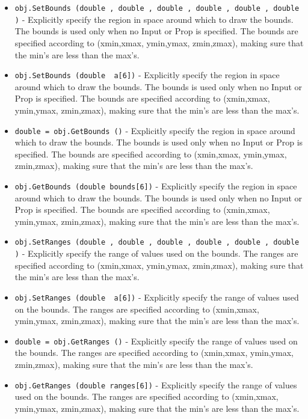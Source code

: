 \begin{itemize}
\item  \verb|obj.SetBounds (double , double , double , double , double , double )| -  Explicitly specify the region in space around which to draw the bounds.
 The bounds is used only when no Input or Prop is specified. The bounds
 are specified according to (xmin,xmax, ymin,ymax, zmin,zmax), making
 sure that the min's are less than the max's.

\item  \verb|obj.SetBounds (double  a[6])| -  Explicitly specify the region in space around which to draw the bounds.
 The bounds is used only when no Input or Prop is specified. The bounds
 are specified according to (xmin,xmax, ymin,ymax, zmin,zmax), making
 sure that the min's are less than the max's.

\item  \verb|double = obj.GetBounds ()| -  Explicitly specify the region in space around which to draw the bounds.
 The bounds is used only when no Input or Prop is specified. The bounds
 are specified according to (xmin,xmax, ymin,ymax, zmin,zmax), making
 sure that the min's are less than the max's.

\item  \verb|obj.GetBounds (double bounds[6])| -  Explicitly specify the region in space around which to draw the bounds.
 The bounds is used only when no Input or Prop is specified. The bounds
 are specified according to (xmin,xmax, ymin,ymax, zmin,zmax), making
 sure that the min's are less than the max's.

\item  \verb|obj.SetRanges (double , double , double , double , double , double )| -  Explicitly specify the range of values used on the bounds.
 The ranges are specified according to (xmin,xmax, ymin,ymax, zmin,zmax), 
 making sure that the min's are less than the max's.

\item  \verb|obj.SetRanges (double  a[6])| -  Explicitly specify the range of values used on the bounds.
 The ranges are specified according to (xmin,xmax, ymin,ymax, zmin,zmax), 
 making sure that the min's are less than the max's.

\item  \verb|double = obj.GetRanges ()| -  Explicitly specify the range of values used on the bounds.
 The ranges are specified according to (xmin,xmax, ymin,ymax, zmin,zmax), 
 making sure that the min's are less than the max's.

\item  \verb|obj.GetRanges (double ranges[6])| -  Explicitly specify the range of values used on the bounds.
 The ranges are specified according to (xmin,xmax, ymin,ymax, zmin,zmax), 
 making sure that the min's are less than the max's.


\end{itemize}
